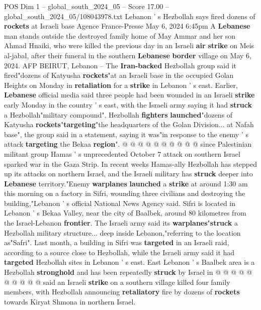\begin{textsample}{POS Dim 1 – global\_south\_2024\_05 – Score 17.00 – global\_south\_2024\_05/108043978.txt}  \label{ex:f1_pos_244}
Lebanon ' s Hezbollah says fired dozens of \textbf{rockets} at Israeli base Agence France-Presse May 6, 2024 6:45pm A \textbf{Lebanese} man stands outside the destroyed family home of May Ammar and her son Ahmad Hnaiki, who were killed the previous day in an Israeli \textbf{air} \textbf{strike} on Meis al-jabal, after their funeral in the southern \textbf{Lebanese} \textbf{border} village on May 6, 2024.
AFP BEIRUT, Lebanon -- The \textbf{Iran-backed} Hezbollah group said it fired"dozens of Katyusha \textbf{rockets}"at an Israeli base in the occupied Golan Heights on Monday in \textbf{retaliation} for a \textbf{strike} in Lebanon ' s east.
Earlier, \textbf{Lebanese} official media said three people had been wounded in an Israeli \textbf{strike} early Monday in the country ' s east, with the Israeli army saying it had \textbf{struck} a Hezbollah"military compound".
Hezbollah \textbf{fighters} \textbf{launched}"dozens of Katyusha \textbf{rockets}"\textbf{targeting}"the headquarters of the Golan Division... at Nafah base", the group said in a statement, saying it was"in response to the enemy ' s attack \textbf{targeting} the Bekaa \textbf{region}". @ @ @ @ @ @ @ @ @ @ since Palestinian militant group Hamas ' s unprecedented October 7 attack on southern Israel sparked war in the Gaza Strip.
In recent weeks Hamas-ally Hezbollah has stepped up its attacks on northern Israel, and the Israeli military has \textbf{struck} deeper into \textbf{Lebanese} territory."Enemy \textbf{warplanes} \textbf{launched} a \textbf{strike} at around 1:30 am this morning on a factory in Sifri, wounding three civilians and destroying the building,"Lebanon ' s official National News Agency said.
Sifri is located in Lebanon ' s Bekaa Valley, near the city of Baalbek, around 80 kilometres from the Israel-Lebanon \textbf{frontier}.
The Israeli army said its \textbf{warplanes}"\textbf{struck} a Hezbollah military structure... deep inside Lebanon,"referring to the location as"Safri".
Last month, a building in Sifri was \textbf{targeted} in an Israeli raid, according to a source close to Hezbollah, while the Israeli army said it had \textbf{targeted} Hezbollah sites in Lebanon ' s east.
East Lebanon ' s Baalbek area is a Hezbollah \textbf{stronghold} and has been repeatedly \textbf{struck} by Israel in @ @ @ @ @ @ @ @ @ @ said an Israeli \textbf{strike} on a southern village killed four family members, with Hezbollah announcing \textbf{retaliatory} fire by dozens of \textbf{rockets} towards Kiryat Shmona in northern Israel.

\end{textsample}
